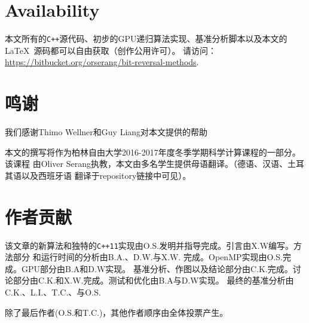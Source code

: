 \documentclass[10pt]{article}
\begin{document}
\begin{CJK*}{UTF8}{gbsn}
\section*{Availability}
本文所有的{\tt C++}源代码、初步的GPU递归算法实现、基准分析脚本以及本文的\LaTeX\ 
源码都可以自由获取（创作公用许可）。
请访问：\url{https://bitbucket.org/orserang/bit-reversal-methods}.\newline

\section*{鸣谢}

我们感谢Thimo Wellner和Guy Liang对本文提供的帮助\newline 

\noindent 本文的撰写将作为柏林自由大学2016-2017年度冬季学期科学计算课程的一部分。该课程
由Oliver Serang执教，本文由多名学生提供母语翻译。（德语、汉语、土耳其语以及西班牙语
翻译于repository链接中可见）。

\section*{作者贡献}
该文章的新算法和独特的{\tt C++11}实现由O.S.发明并指导完成。引言由X.W编写。方法部分
和运行时间的分析由B.A.、D.W.与X.W. 完成。OpenMP实现由O.S.完成。GPU部分由B.A和D.W实现。
基准分析、作图以及结论部分由C.K.完成。讨论部分由C.K.和X.W.完成。测试和优化由B.A与D.W实现。
最终的基准分析由C.K.、L.I.、T.C.、与O.S.\newline

\noindent 除了最后作者(O.S.和T.C.)，其他作者顺序由全体投票产生。




\clearpage\end{CJK*}
\end{document}
